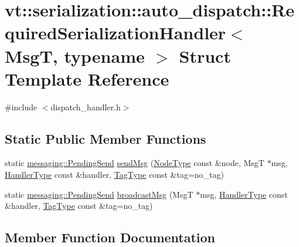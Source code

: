 \hypertarget{structvt_1_1serialization_1_1auto__dispatch_1_1_required_serialization_handler}{}\section{vt\+:\+:serialization\+:\+:auto\+\_\+dispatch\+:\+:Required\+Serialization\+Handler$<$ MsgT, typename $>$ Struct Template Reference}
\label{structvt_1_1serialization_1_1auto__dispatch_1_1_required_serialization_handler}


{\ttfamily \#include $<$dispatch\+\_\+handler.\+h$>$}

\subsection*{Static Public Member Functions}
\begin{DoxyCompactItemize}
\item 
static \hyperlink{structvt_1_1messaging_1_1_pending_send}{messaging\+::\+Pending\+Send} \hyperlink{structvt_1_1serialization_1_1auto__dispatch_1_1_required_serialization_handler_aaa8f18c0e7446bc79879c8e0eae2fede}{send\+Msg} (\hyperlink{namespacevt_a866da9d0efc19c0a1ce79e9e492f47e2}{Node\+Type} const \&node, MsgT $\ast$msg, \hyperlink{namespacevt_af64846b57dfcaf104da3ef6967917573}{Handler\+Type} const \&handler, \hyperlink{namespacevt_a84ab281dae04a52a4b243d6bf62d0e52}{Tag\+Type} const \&tag=no\+\_\+tag)
\item 
static \hyperlink{structvt_1_1messaging_1_1_pending_send}{messaging\+::\+Pending\+Send} \hyperlink{structvt_1_1serialization_1_1auto__dispatch_1_1_required_serialization_handler_ac31403a312e8b53f90269a84b0f5b54f}{broadcast\+Msg} (MsgT $\ast$msg, \hyperlink{namespacevt_af64846b57dfcaf104da3ef6967917573}{Handler\+Type} const \&handler, \hyperlink{namespacevt_a84ab281dae04a52a4b243d6bf62d0e52}{Tag\+Type} const \&tag=no\+\_\+tag)
\end{DoxyCompactItemize}


\subsection{Member Function Documentation}
\mbox{\label{structvt_1_1serialization_1_1auto__dispatch_1_1_required_serialization_handler_ac31403a312e8b53f90269a84b0f5b54f}} 
